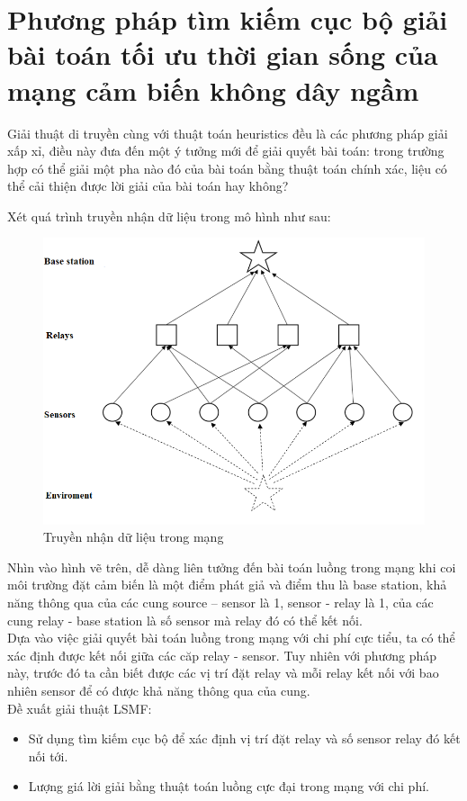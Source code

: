 \chapter{Phương pháp tìm kiếm cục bộ giải bài toán tối ưu thời gian sống của mạng cảm biến không dây ngầm}
Giải thuật di truyền cùng với thuật toán heuristics đều là các phương pháp giải xấp xỉ, điều này đưa đến một ý tưởng mới để giải quyết bài toán: trong trường hợp có thể giải một pha nào đó của bài toán bằng thuật toán chính xác, liệu có thể cải thiện được lời giải của bài toán hay không?

Xét quá trình truyền nhận dữ liệu trong mô hình như sau:
\begin{figure}[H]
    \includegraphics[width=\linewidth]{picture/lite_flow.png}
    \caption{Truyền nhận dữ liệu trong mạng}
\end{figure}
Nhìn vào hình vẽ trên, dễ dàng liên tưởng đến bài toán luồng trong mạng khi coi môi trường đặt cảm biến là một điểm phát giả và điểm thu là base station, khả năng thông qua của các cung source – sensor là 1, sensor - relay là 1, của các cung relay - base station là số sensor mà relay đó có thể kết nối. 
\\Dựa vào việc giải quyết bài toán luồng trong mạng với chi phí cực tiểu, ta có thể xác định được kết nối giữa các căp relay - sensor. Tuy nhiên với phương pháp này, trước đó ta cần biết được các vị trí đặt relay và mỗi relay kết nối với bao nhiên sensor để có được khả năng thông qua của cung.
\\Đề xuất giải thuật LSMF:
\begin{itemize}
    \item Sử dụng tìm kiếm cục bộ để xác định vị trí đặt relay và số sensor relay đó kết nối tới.
    \item Lượng giá lời giải bằng thuật toán luồng cực đại trong mạng với chi phí.
\end{itemize}
